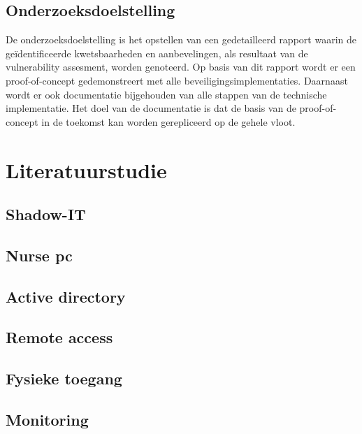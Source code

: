 \subsection{Onderzoeksdoelstelling}
De onderzoeksdoelstelling is het opstellen van een gedetailleerd rapport waarin de geïdentificeerde kwetsbaarheden en aanbevelingen, als resultaat van de vulnerability assesment, worden genoteerd.
Op basis van dit rapport wordt er een proof-of-concept gedemonstreert met alle beveiligingsimplementaties.
Daarnaast wordt er ook documentatie bijgehouden van alle stappen van de technische implementatie.
Het doel van de documentatie is dat de basis van de proof-of-concept in de toekomst kan worden gerepliceerd op de gehele vloot.


\section{Literatuurstudie}%
\label{sec:literatuurstudie}
\subsection{Shadow-IT}
\subsection{Nurse pc}
\subsection{Active directory}
\subsection{Remote access}
\subsection{Fysieke toegang}
\subsection{Monitoring}



